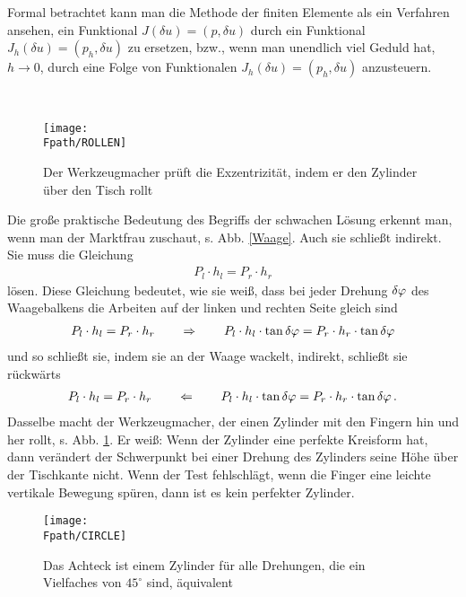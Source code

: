 \hspace*{-12pt}\colorbox{highlightBlue}{\parbox{0.98\textwidth}{
Formal betrachtet kann man die Methode der finiten Elemente als ein Verfahren ansehen, ein Funktional $J(\delta u) = (p, \delta u)$ durch ein Funktional $J_h(\delta u) = (p_h, \delta u)$ zu ersetzen, bzw., wenn man unendlich viel Geduld hat, $h \to 0$, durch eine Folge von Funktionalen $J_h(\delta u) = (p_h, \delta u)$ anzusteuern.}}\\

\begin{figure}[tbp]
\centering
\if {} \sidecaption \fi
\texttt{[image: \\Fpath/ROLLEN]}
\caption{Der Werkzeugmacher pr\"{u}ft die Exzentrizit\"{a}t, indem er den Zylinder \"{u}ber den Tisch rollt} \label{Rollen}
\end{figure}%

Die gro{\ss}e praktische Bedeutung des Begriffs der schwachen L\"{o}sung erkennt man, wenn man der Marktfrau zuschaut, s. Abb. \ref{Waage}. Auch sie schlie{\ss}t indirekt. Sie muss die Gleichung
\begin{align}
P_l \cdot h_l = P_r \cdot h_r
\end{align}
l\"{o}sen. Diese Gleichung bedeutet, wie sie wei{\ss}, dass bei jeder Drehung $\delta \varphi$ des Waagebalkens die Arbeiten auf der linken und rechten Seite gleich sind
\begin{align}
P_l \cdot h_l = P_r \cdot h_r \qquad \Rightarrow \qquad P_l \cdot h_l \cdot \tan \delta \varphi = P_r \cdot h_r \cdot \tan\delta \varphi
\end{align}
und so schlie{\ss}t sie, indem sie an der Waage wackelt, indirekt, schlie{\ss}t sie \glq r\"{u}ckw\"{a}rts\grq{}
\begin{align}
P_l \cdot h_l = P_r \cdot h_r \qquad \Leftarrow \qquad P_l \cdot h_l \cdot \tan\delta \varphi = P_r \cdot h_r \cdot \tan\delta \varphi\,.
\end{align}
Dasselbe macht der Werkzeugmacher, der einen Zylinder mit den Fingern hin und her rollt, s. Abb. \ref{Rollen}. Er wei{\ss}: Wenn der Zylinder eine perfekte Kreisform hat, dann ver\"{a}ndert der Schwerpunkt bei einer  Drehung des Zylinders seine H\"{o}he \"{u}ber der Tischkante nicht. Wenn der Test fehlschl\"{a}gt, wenn die Finger eine leichte vertikale Bewegung sp\"{u}ren, dann ist es kein perfekter Zylinder.
\begin{figure}[tbp]
\centering
\if {} \sidecaption \fi
\texttt{[image: \\Fpath/CIRCLE]}
\caption{Das Achteck ist einem Zylinder f\"{u}r alle Drehungen, die ein Vielfaches von $45^\circ$ sind, \"{a}quivalent } \label{Circle}
\end{figure}%

